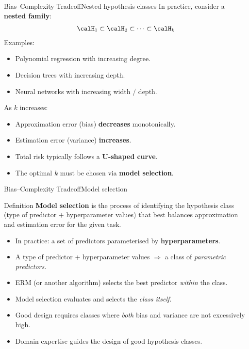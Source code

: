 \begin{frame}{Bias–Complexity Tradeoff}{Nested hypothesis classes}
  In practice, consider a \textbf{nested family}:
  \[
    \calH_1 \subset \calH_2 \subset \cdots \subset \calH_k
  \]
  Examples:
  \begin{itemize}
    \item Polynomial regression with increasing degree.
    \item Decision trees with increasing depth.
    \item Neural networks with increasing width / depth.
  \end{itemize}
  \bigskip
  As $k$ increases:
  \begin{itemize}
    \item Approximation error (bias) \textbf{decreases} monotonically.
    \item Estimation error (variance) \textbf{increases}.
    \item Total risk typically follows a \textbf{U-shaped curve}.
    \item The optimal $k$ must be chosen via \textbf{model selection}.
  \end{itemize}
\end{frame}

\begin{frame}{Bias–Complexity Tradeoff}{Model selection}
  \begin{block}{Definition}
    \textcolor{AccentBlue}{\textbf{Model selection}} is the process of identifying the
    hypothesis class (type of predictor + hyperparameter values) that best balances
    approximation and estimation error for the given task.
  \end{block}
  \bigskip
  \begin{itemize}
    \item In practice: a set of predictors parameterised by \textbf{hyperparameters}.
    \item A type of predictor + hyperparameter values $\Rightarrow$ a class of
          \emph{parametric predictors}.
    \item ERM (or another algorithm) selects the best predictor \emph{within} the class.
    \item Model selection evaluates and selects the \emph{class itself}.
  \end{itemize}
  \bigskip
  \begin{itemize}
    \item Good design requires classes where \emph{both} bias and variance are not
          excessively high.
    \item Domain expertise guides the design of good hypothesis classes.
  \end{itemize}
\end{frame}


